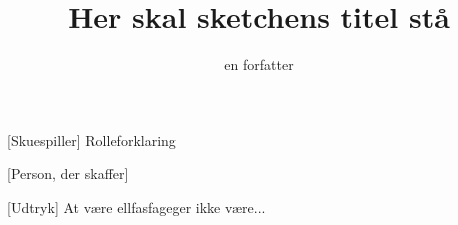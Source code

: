 \documentclass[a4paper,11pt]{article}
\title{Her skal sketchens titel stå}
\author{en forfatter}
\begin{document}
\maketitle

\begin{roles}
[Skuespiller] Rolleforklaring
\end{roles}

\begin{props}
[Person, der skaffer]
\end{props}


\begin{sketch}


[Udtryk] At være ellfasfageger ikke være... 



\end{sketch}
\end{document}
